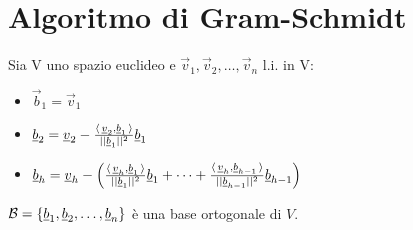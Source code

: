 \section{Algoritmo di Gram-Schmidt}

Sia V uno spazio euclideo e $\vec{v}_1, \vec{v}_2, \dots, \vec{v}_n$ l.i. in V:
\begin{itemize}
	\item $\vec{b}_1 = \vec{v}_1$
	\item $\underline{b}_2 = \underline{v}_2 - \frac{\langle\,\underline{v}_2,\underline{b}_1\,\rangle}{||\underline{b}_1||^2}\underline{b}_1$
	\item $\underline{b}_h = \underline{v}_h - \left(
		\frac{\langle\,\underline{v}_h,\underline{b}_1\,\rangle}{||\underline{b}_1||^2}\underline{b}_1 +
		\cdots +
		\frac{\langle\,\underline{v}_h,\underline{b}_{h-1}\,\rangle}{||\underline{b}_{h-1}||^2}\underline{b}_{h-1}
	\right)$
\end{itemize}

$\mathcal{B} = \{\underline{b}_1, \underline{b}_2, \dots, \underline{b}_n\}$ è una base ortogonale di $V$.
